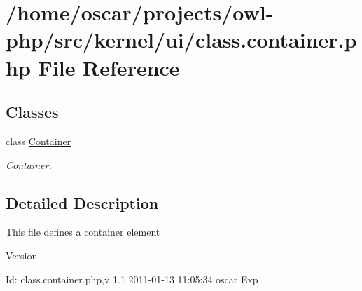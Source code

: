 \section{/home/oscar/projects/owl-\/php/src/kernel/ui/class.container.php File Reference}
\label{kernel_2ui_2class_8container_8php}
\subsection*{Classes}
\begin{DoxyCompactItemize}
\item 
class \hyperlink{classContainer}{Container}
\begin{DoxyCompactList}\small\item\em \hyperlink{classContainer}{Container}. \item\end{DoxyCompactList}\end{DoxyCompactItemize}


\subsection{Detailed Description}
This file defines a container element \begin{DoxyVersion}{Version}

\end{DoxyVersion}
\begin{DoxyParagraph}{Id:}
class.container.php,v 1.1 2011-\/01-\/13 11:05:34 oscar Exp 
\end{DoxyParagraph}
